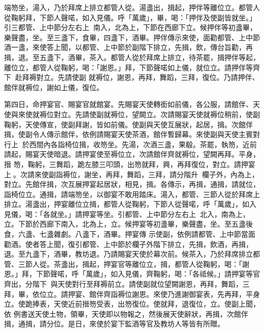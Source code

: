 \begin{pinyinscope}
 端笏坐，湯入，乃於拜席上排立都管人從。湯盞出，揖起，押伴等離位立。都管人從鞠躬拜，下節人聲喏，如入見儀。呼「萬歲」，畢，喝：「押伴及使副皆就坐。」引三都管、上中節分左右上，南入，北為上，下節在西廊下立。候押伴等初盞畢，樂聲盡，坐。至三盞下，食畢，四盞下，酒畢。押伴傳示來使，面勸都管、上中節酒一盞，來使答上聞，以都管、上中節於副階下排立，先揖，飲，傳台旨勸，再揖，退。至五盞下，酒畢，茶入。都管人從於拜席上排立，待茶罷，揖押伴等起，離位立，都管人從鞠躬，喝：「謝恩。」拜，下節聲喏如上儀，就位立。請押伴等齊下，赴拜褥對立。先請使副
 就褥位，謝恩，再拜，舞蹈，三拜，復位。乃請押伴、館伴就褥位，謝如上儀，復位。



 第四日，命押宴官、賜宴官就館宴。先賜宴天使轉銜如前儀，各公服，請館伴、天使與來使就褥位對立。先請使副就褥位，望闕立。次請賜宴天使就褥位稍前，使副鞠躬，天使傳宣，使副拜謝，皆如前儀。使副與天使互展狀，起居，揖。次館伴揖，使副令人傳示館伴，依例請賜宴天使茶酒，館伴暫歸幕。來使副與天使主賓對行上，於西間內各詣椅位揖，收笏坐。先湯，次酒三盞，果殽。茶罷，執笏，近前請起，賜宴天使暗退。請押宴使至褥位立，次請館伴齊就褥位，望闕再拜。平身，搢
 笏，鞠躬，三舞蹈，跪左膝三叩頭，出笏就拜，興，再拜復位，對立。請押宴上。次請來使副詣褥位，謝坐，再拜，舞蹈，三拜，請分階升，欄子外，內為上，對立。先館伴揖，次互展押宴起居狀，相見，揖。各傳示，再揖，通揖，請就位，詣椅位立。通揖，請端笏坐，以御宴不敢用踏床。湯入，都管、三節人從於拜席上排立。湯盞出，押宴離位立揖，都管人從鞠躬，下節人從聲喏，呼「萬歲」，如入見儀，喝：「各就坐。」請押宴等坐。引都管、上中節分左右上，北入，南為上，立。下節於西廊下南入，北為上，立。候押宴等初盞畢，樂聲盡，坐。至五盞後食，六盞、七盞雜劇。八盞下，酒畢。押宴傳
 示使副，依例請都管、上中節當面勸酒。使者答上聞，復引都管、上中節於欄子外階下排立，先揖，飲酒，再揖，退。至九盞下，酒畢，教坊退。乃請賜宴天使於幕次前。候茶入，乃於拜席排立都管、三節人從。茶盞出，揖起，押宴官等離位立，揖，都管人從鞠躬，喝：「謝恩。」拜，下節聲喏，呼「萬歲」，如入見儀，齊鞠躬，喝：「各祗候。」請押宴等官齊出，分階下，與天使對行至拜褥前立。請使副就位望闕謝恩，再拜，舞蹈，三拜，畢，依位立。請押宴、館伴齊詣褥位謝恩。來使乃進謝御宴表，先再拜，平身立。使跪捧表，天使近前搢笏受表，出笏復位。使就拜，退復位，立。使副上聞，依
 例書送天使土物，領畢，天使即以物報之，然後展天使辭狀，再揖，次館伴揖，通揖，請分位。是日，來使於宴下監酒等官及教坊人等皆有所贈。




\end{pinyinscope}
